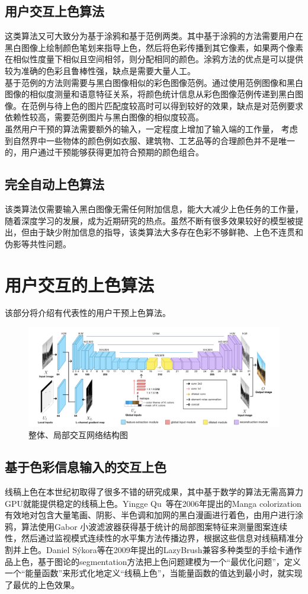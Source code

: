 \documentclass[conference]{IEEEtran}
\begin{document}
\subsection{用户交互上色算法}
    这类算法又可大致分为基于涂鸦和基于范例两类。其中基于涂鸦的方法需要用户在黑白图像上绘制颜色笔划来指导上色，然后将色彩传播到其它像素，如果两个像素在相似性度量下相似且空间相邻，则分配相同的颜色。涂鸦方法的优点是可以提供较为准确的色彩且鲁棒性强，缺点是需要大量人工。\\
    基于范例的方法则需要与黑白图像相似的彩色图像范例。通过使用范例图像和黑白图像的相似度测量和语意特征关系，将颜色统计信息从彩色图像范例传递到黑白图像。在范例与待上色的图片匹配度较高时可以得到较好的效果，缺点是对范例要求依赖性较高，需要范例图片与黑白图像的相似度较高。\\
    虽然用户干预的算法需要额外的输入，一定程度上增加了输入端的工作量， 考虑到自然界中一些物体的颜色例如衣服、建筑物、工艺品等的合理颜色并不是唯一的，用户通过干预能够获得更加符合预期的颜色组合。
\subsection{完全自动上色算法}
    该类算法仅需要输入黑白图像无需任何附加信息，能大大减少上色任务的工作量，随着深度学习的发展，成为近期研究的热点。虽然不断有很多效果较好的模型被提出，但由于缺少附加信息的指导，该类算法大多存在色彩不够鲜艳、上色不连贯和伪影等共性问题。
\section{用户交互的上色算法}
该部分将介绍有代表性的用户干预上色算法。

\begin{figure}[t]
    \centerline{\includegraphics[totalheight = 2.5in]{zhang2017style.png}}
    \caption{整体、局部交互网络结构图}
    \label{zhang2017style}
    \end{figure}
\subsection{基于色彩信息输入的交互上色}
线稿上色在本世纪初取得了很多不错的研究成果，其中基于数学的算法无需高算力GPU就能提供稳定的线稿上色。Yingge Qu 等在2006年提出的Manga colorization\cite{qu-2006-manga}有效地对包含大量笔画、阴影、半色调和加网的黑白漫画进行着色，由用户进行涂鸦，算法使用Gabor 小波滤波器获得基于统计的局部图案特征来测量图案连续性，然后通过监视模式连续性的水平集方法传播边界，根据这些信息对线稿精准分割并上色。Daniel Sýkora等在2009年提出的LazyBrush\cite{sykora2009lazybrush}兼容多种类型的手绘卡通作品上色，基于图论的segmentation方法把上色问题建模为一个“最优化问题”，定义一个“能量函数”来形式化地定义“线稿上色”，当能量函数的值达到最小时，就实现了最优的上色效果。
\end{document}
